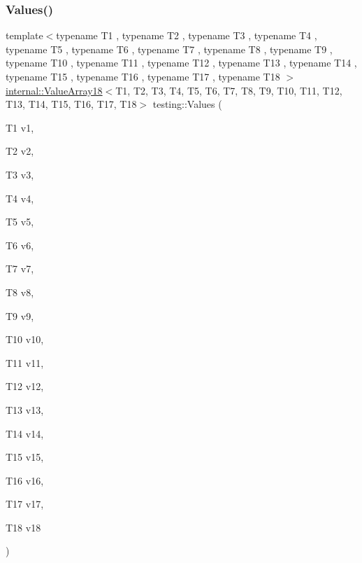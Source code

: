 \subsubsection{\texorpdfstring{Values()}{Values()}\hspace{0.1cm}{\footnotesize\ttfamily [19/51]}}
{\footnotesize\ttfamily template$<$typename T1 , typename T2 , typename T3 , typename T4 , typename T5 , typename T6 , typename T7 , typename T8 , typename T9 , typename T10 , typename T11 , typename T12 , typename T13 , typename T14 , typename T15 , typename T16 , typename T17 , typename T18 $>$ \\
\mbox{\hyperlink{classtesting_1_1internal_1_1_value_array18}{internal\+::\+Value\+Array18}}$<$T1, T2, T3, T4, T5, T6, T7, T8, T9, T10, T11, T12, T13, T14, T15, T16, T17, T18$>$ testing\+::\+Values (\begin{DoxyParamCaption}\item[{T1}]{v1,  }\item[{T2}]{v2,  }\item[{T3}]{v3,  }\item[{T4}]{v4,  }\item[{T5}]{v5,  }\item[{T6}]{v6,  }\item[{T7}]{v7,  }\item[{T8}]{v8,  }\item[{T9}]{v9,  }\item[{T10}]{v10,  }\item[{T11}]{v11,  }\item[{T12}]{v12,  }\item[{T13}]{v13,  }\item[{T14}]{v14,  }\item[{T15}]{v15,  }\item[{T16}]{v16,  }\item[{T17}]{v17,  }\item[{T18}]{v18 }\end{DoxyParamCaption})}

\mbox{\label{namespacetesting_a673757dbfc048bbb48e459485b30b2bf}} 
